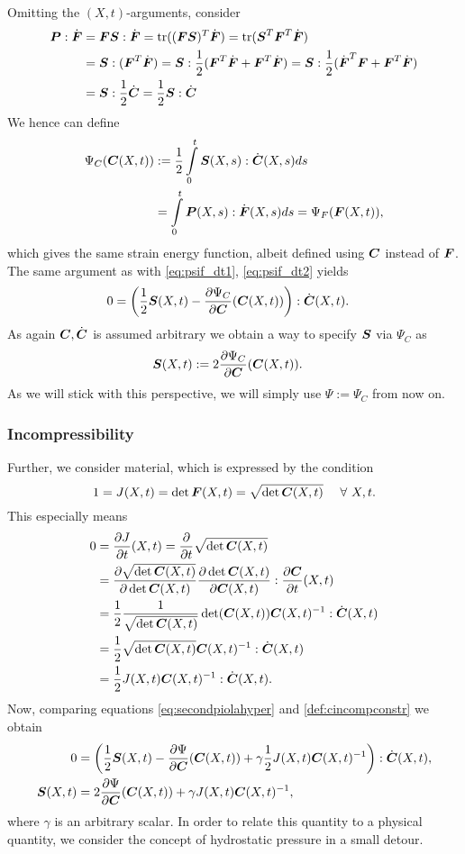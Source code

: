 Omitting the $(X,t)$-arguments, consider
\begin{align}
	\boldsymbol{P}:\dot{\boldsymbol{F}} &= \boldsymbol{F}\boldsymbol{S} : \dot{\boldsymbol{F}} = \operatorname{tr}((\boldsymbol{F}\boldsymbol{S})^T\dot{\boldsymbol{F}}) = \operatorname{tr}(\boldsymbol{S}^T\boldsymbol{F}^T\dot{\boldsymbol{F}})\\
	&= \boldsymbol{S} : (\boldsymbol{F}^T\dot{\boldsymbol{F}}) = \boldsymbol{S} : \frac{1}{2}(\boldsymbol{F}^T\dot{\boldsymbol{F}} + \boldsymbol{F}^T\dot{\boldsymbol{F}})  = \boldsymbol{S} : \frac{1}{2}(\dot{\boldsymbol{F}}^T\boldsymbol{F} + \boldsymbol{F}^T\dot{\boldsymbol{F}})\\
	&= \boldsymbol{S} : \frac{1}{2}\dot{\boldsymbol{C}} = \frac{1}{2}\boldsymbol{S} : \dot{\boldsymbol{C}}
\end{align}
We hence can define
\begin{align}
	\Psi_C(\boldsymbol{C}(X,t)) &:= \frac{1}{2}\int\limits_{0}^{t}\boldsymbol{S}(X,s):\dot{\boldsymbol{C}}(X,s)ds\\
		& = \int\limits_{0}^{t}\boldsymbol{P}(X,s):\dot{\boldsymbol{F}}(X,s)ds = \Psi_F(\boldsymbol{F}(X,t)),
\end{align}
which gives the same strain energy function, albeit defined using $\boldsymbol{C}$ instead of $\boldsymbol{F}$.
The same argument as with \eqref{eq:psif_dt1}, \eqref{eq:psif_dt2} yields
\begin{align}
	0 &= \left(\frac{1}{2}\boldsymbol{S}(X,t) - \frac{\partial \Psi_C}{\partial \boldsymbol{C}}(\boldsymbol{C}(X,t))\right):\dot{\boldsymbol{C}}(X,t).\label{eq:secondpiolahyper}
\end{align}
As again $\boldsymbol{C},\dot{\boldsymbol{C}}$ is assumed arbitrary we obtain a way to specify $\boldsymbol{S}$ via $\Psi_C$ as
\begin{align}
	\boldsymbol{S}(X,t) & := 2\frac{\partial \Psi_C}{\partial \boldsymbol{C}}(\boldsymbol{C}(X,t)).
\end{align}
As we will stick with this perspective, we will simply use $\Psi := \Psi_C$ from now on.

\subsubsection{Incompressibility}
Further, we consider  material, which is expressed by the condition 
\[
	1 = J(X,t) = \det\boldsymbol{F}(X,t) = \sqrt{\det\boldsymbol{C}(X,t)}\quad~\forall~ X,t.
\]
This especially means
\begin{align}
	0 &= \frac{\partial J}{\partial t}(X,t) = \frac{\partial }{\partial t}\sqrt{\det\boldsymbol{C}(X,t)}\nonumber\\
	&= \frac{\partial \sqrt{\det\boldsymbol{C}(X,t)}}{\partial \det\boldsymbol{C}(X,t)}\frac{\partial \det\boldsymbol{C}(X,t)}{\partial \boldsymbol{C}(X,t)}:\frac{\partial \boldsymbol{C}}{\partial t}(X,t)\nonumber\\
	&=\frac{1}{2}\frac{1}{\sqrt{\det\boldsymbol{C}(X,t)}} \det(\boldsymbol{C}(X,t))\boldsymbol{C}(X,t)^{-1}:\dot{\boldsymbol{C}}(X,t)\nonumber\\
	&=\frac{1}{2}\sqrt{\det\boldsymbol{C}(X,t)}\boldsymbol{C}(X,t)^{-1}:\dot{\boldsymbol{C}}(X,t)\nonumber\\
	&=\frac{1}{2}J(X,t)\boldsymbol{C}(X,t)^{-1}:\dot{\boldsymbol{C}}(X,t).\label{def:cincompconstr}
\end{align}
Now, comparing equations \eqref{eq:secondpiolahyper} and \eqref{def:cincompconstr} we obtain
\begin{align}
	0 &= \left(\frac{1}{2}\boldsymbol{S}(X,t) - \frac{\partial \Psi}{\partial \boldsymbol{C}}(\boldsymbol{C}(X,t)) + \gamma\frac{1}{2}J(X,t)\boldsymbol{C}(X,t)^{-1}\right):\dot{\boldsymbol{C}}(X,t),\\
	\boldsymbol{S}(X,t) &= 2\frac{\partial \Psi}{\partial \boldsymbol{C}}(\boldsymbol{C}(X,t)) + \gamma J(X,t)\boldsymbol{C}(X,t)^{-1},\label{def:incompressible_secondpiola}
\end{align}
where $\gamma$ is an arbitrary scalar.
In order to relate this quantity to a physical quantity, we consider the concept of hydrostatic pressure in a small detour.

